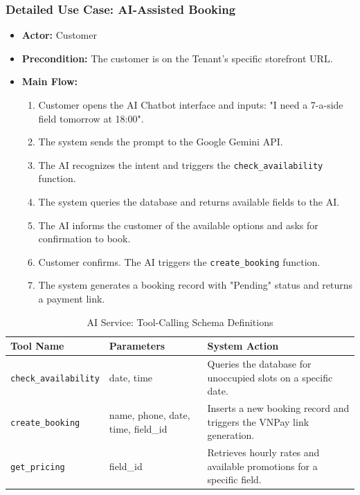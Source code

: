 \subsubsection{Detailed Use Case: AI-Assisted Booking}
\begin{itemize}
    \item \textbf{Actor:} Customer
    \item \textbf{Precondition:} The customer is on the Tenant's specific storefront URL.
    \item \textbf{Main Flow:}
    \begin{enumerate}
        \item Customer opens the AI Chatbot interface and inputs: "I need a 7-a-side field tomorrow at 18:00".
        \item The system sends the prompt to the Google Gemini API.
        \item The AI recognizes the intent and triggers the \texttt{check\_availability} function.
        \item The system queries the database and returns available fields to the AI.
        \item The AI informs the customer of the available options and asks for confirmation to book.
        \item Customer confirms. The AI triggers the \texttt{create\_booking} function.
        \item The system generates a booking record with "Pending" status and returns a payment link.
    \end{enumerate}
\end{itemize}

\begin{table}[htbp]
\centering
\begin{tabularx}{\textwidth}{|l|l|X|}
\hline
\rowcolor{LightCyan}
\textbf{Tool Name} & \textbf{Parameters} & \textbf{System Action} \\ \hline
\texttt{check\_availability} & date, time & Queries the database for unoccupied slots on a specific date. \\ \hline
\texttt{create\_booking} & name, phone, date, time, field\_id & Inserts a new booking record and triggers the VNPay link generation. \\ \hline
\texttt{get\_pricing} & field\_id & Retrieves hourly rates and available promotions for a specific field. \\ \hline
\end{tabularx}
\caption{AI Service: Tool-Calling Schema Definitions}
\label{tab:ai_tools}
\end{table}




